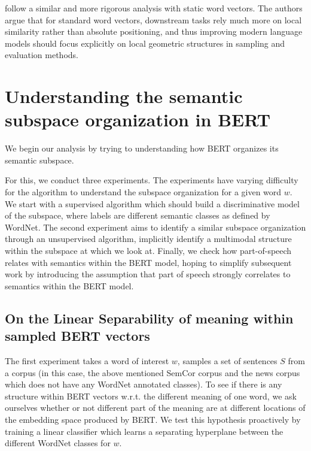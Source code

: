 \documentclass[a4paper,12pt,twoside,openright]{report}
\begin{document}
\cite{whitaker19} follow a similar and more rigorous analysis with static word vectors. 
The authors argue that for standard word vectors, downstream tasks rely much more on local similarity rather than absolute positioning, and thus improving modern language models should focus explicitly on local geometric structures in sampling and evaluation methods.

\chapter{Understanding the semantic subspace organization in BERT}\label{section:Understand_BERT}\label{section:UnderstandingBERT} 


We begin our analysis by trying to understanding how BERT organizes its semantic subspace.

For this, we conduct three experiments.
The experiments have varying difficulty for the algorithm to understand the subspace organization for a given word $w$.
We start with a supervised algorithm which should build a discriminative model of the subspace, where labels are different semantic classes as defined by WordNet.
The second experiment aims to identify a similar subspace organization through an unsupervised algorithm, implicitly identify a multimodal structure within the subspace at which we look at.
Finally, we check how part-of-speech relates with semantics within the BERT model, hoping to simplify subsequent work by introducing the assumption that part of speech strongly correlates to semantics within the BERT model.



\section{On the Linear Separability of meaning within sampled BERT vectors}

The first experiment takes a word of interest $w$, samples a set of sentences $S$ from a corpus (in this case, the above mentioned SemCor corpus and the news corpus \cite{news_corpus} which does not have any WordNet annotated classes).
To see if there is any structure within BERT vectors w.r.t. the different meaning of one word, we ask ourselves whether or not different part of the meaning are at different locations of the embedding space produced by BERT.
We test this hypothesis proactively by training a linear classifier which learns a separating hyperplane between the different WordNet classes for $w$.
\end{document}
